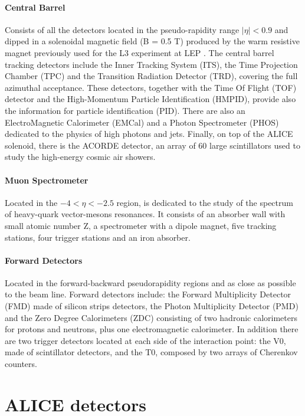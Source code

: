 \paragraph{Central Barrel}
Consists of all the detectors located in the pseudo-rapidity range $|\eta| < 0.9$ and dipped in a 
solenoidal magnetic field (B = 0.5 T) produced by the warm resistive magnet previously used for
the L3 experiment at LEP \cite{lep}.
The central barrel  tracking detectors include the Inner Tracking System (ITS), the Time Projection 
Chamber (TPC) and the Transition Radiation Detector (TRD), covering the full azimuthal acceptance.
These detectors, together with the Time Of Flight (TOF) detector and the High-Momentum 
Particle Identification (HMPID), provide also the information for particle identification (PID).
There are also an ElectroMagnetic Calorimeter (EMCal) and a Photon Spectrometer (PHOS) dedicated to the
physics of high \pt photons and jets.
Finally, on top of the ALICE solenoid, there is the ACORDE detector, an array of 60 large scintillators
used to study the high-energy cosmic air showers.

\paragraph{Muon Spectrometer} 
Located in the $-4 < \eta < -2.5$ region, is dedicated to the study of the spectrum of 
heavy-quark vector-mesons resonances.
It consists of an absorber wall with small atomic number Z, a spectrometer with a dipole magnet,
five tracking stations, four trigger stations and an iron absorber.

\paragraph{Forward Detectors}
Located in the forward-backward pseudorapidity regions and as close as possible to the beam line.
Forward detectors include: the Forward Multiplicity Detector (FMD) made of silicon strips detectors,
the Photon
Multiplicity Detector (PMD) and the Zero Degree Calorimeters (ZDC) consisting of two hadronic 
calorimeters for protons and neutrons, plus one electromagnetic calorimeter. 
In addition there are two trigger detectors located at each side of the interaction point:
the V0, made of scintillator detectors, and the T0, composed by two arrays of Cherenkov counters.

%
%
\section{ALICE detectors} \label{sec:alice_detectors}

